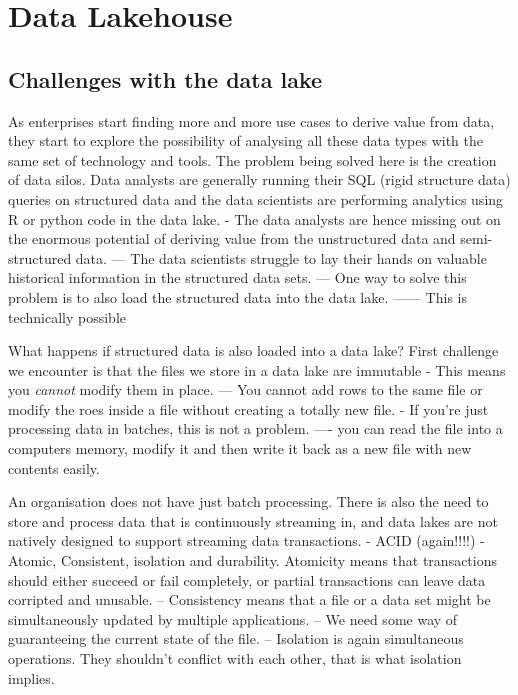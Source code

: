 \documentclass[a4paper, 11pt]{article}
\begin{document}
    \section{Data Lakehouse}

    \subsection{Challenges with the data lake}

    As enterprises start finding more and more use cases to derive value from data, they start to explore the possibility of analysing all these data types with the same set of technology and tools.
    The problem being solved here is the creation of data silos.
    Data analysts are generally running their SQL (rigid structure data) queries on structured data and the data scientists are performing analytics using R or python code in the data lake.
    - The data analysts are hence missing out on the enormous potential of deriving value from the unstructured data and semi-structured data.
    --- The data scientists struggle to lay their hands on valuable historical information in the structured data sets.
    --- One way to solve this problem is to also load the structured data into the data lake.
    ------ This is technically possible

    What happens if structured data is also loaded into a data lake?
    First challenge we encounter is that the files we store in a data lake are immutable
    - This means you \textit{cannot} modify them in place.
    --- You cannot add rows to the same file or modify the roes inside a file without creating a totally new file.
    - If you're just processing data in batches, this is not a problem.
    ---- you can read the file into a computers memory, modify it and then write it back as a new file with new contents easily.

    An organisation does not have just batch processing.
    There is also the need to store and process data that is continuously streaming in, and data lakes are not natively designed to support streaming data transactions.
    - ACID (again!!!!) - Atomic, Consistent, isolation and durability.
    Atomicity means that transactions should either succeed or fail completely, or partial transactions can leave data corripted and unusable.
    -- Consistency means that a file or a data set might be simultaneously updated by multiple applications.
    -- We need some way of guaranteeing the current state of the file.
    -- Isolation is again simultaneous operations. They shouldn't conflict with each other, that is what isolation implies.
\end{document}

